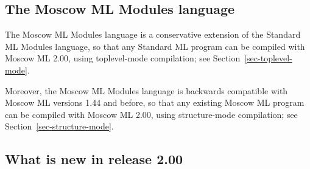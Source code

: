 \documentclass[fleqn,a4paper]{article}
\begin{document}
\subsection{The Moscow ML Modules language}

The Moscow ML Modules language is a conservative extension of the
Standard ML Modules language, so that any Standard ML program can be
compiled with Moscow ML 2.00, using toplevel-mode compilation; see
Section~\ref{sec-toplevel-mode}.

Moreover, the Moscow ML Modules language is backwards compatible with
Moscow ML versions 1.44 and before, so that any existing Moscow ML
program can be compiled with Moscow ML 2.00, using structure-mode
compilation; see Section~\ref{sec-structure-mode}.


\subsection{What is new in release 2.00}
\end{document}
